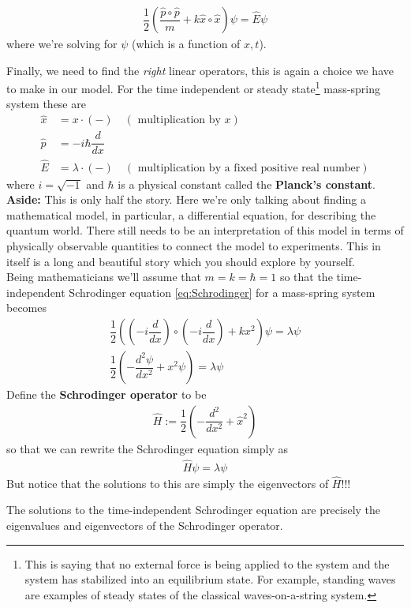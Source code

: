 	\begin{align}
		\label{eq:Schrodinger}
		\dfrac{1}{2} \left(\dfrac{\hat{p} \circ \hat{p}}{m} + k \hat{x} \circ \hat{x}\right)\psi = \hat{E} \psi
	\end{align}
where we're solving for $\psi$ (which is a function of $x, t$).

Finally, we need to find the \emph{right} linear operators, this is again a choice we have to make in our model. For the time independent or steady state\footnote{This is saying that no external force is being applied to the system and the system has stabilized into an equilibrium state. For example, standing waves are examples of steady states of the classical waves-on-a-string system.} mass-spring system these are
\begin{align*}
	\hat{x} &= x \cdot (-) \quad(\mbox{ multiplication by } x) \\
	\hat{p} &= -i \hbar \dfrac{d}{d x} \\
		\hat{E} &= \lambda \cdot (-) \quad(\mbox{ multiplication by a fixed positive real number})
\end{align*}
where $i = \sqrt{-1}$ and $\hbar$ is a physical constant called the \textbf{Planck's constant}.\\

\noindent \textbf{Aside: } This is only half the story. Here we're only talking about finding a mathematical model, in particular, a differential equation, for describing the quantum world. There still needs to be an interpretation of this model in terms of physically observable quantities to connect the model to experiments. This in itself is a long and beautiful story which you should explore by yourself.\\

Being mathematicians we'll assume that $m = k = \hbar = 1$ so that the time-independent Schrodinger equation \eqref{eq:Schrodinger} for a mass-spring system becomes
\begin{align*}
	\dfrac{1}{2} \left({\left(-i \dfrac{d}{d x}\right) \circ \left(-i \dfrac{d}{d x}\right)} + k x^2\right)\psi = \lambda \psi \\
	 \dfrac{1}{2} \left(-\dfrac{d^2 \psi}{d x^2} + {x}^2 \psi \right) = \lambda \psi
\end{align*}
Define the \textbf{Schrodinger operator} to be
\begin{align*}
		\hat{H} := \dfrac{1}{2}	\left(- \dfrac{d^2}{d x^2} + {\hat{x}}^2 \right)
\end{align*}
so that we can rewrite the Schrodinger equation simply as
\begin{align*}
	\hat{H} \psi = \lambda \psi
\end{align*}
But notice that the solutions to this are simply the eigenvectors of $\hat{H}$!!!
\begin{prop}
		The solutions to the time-independent Schrodinger equation are precisely the eigenvalues and eigenvectors of the Schrodinger operator.
\end{prop}







